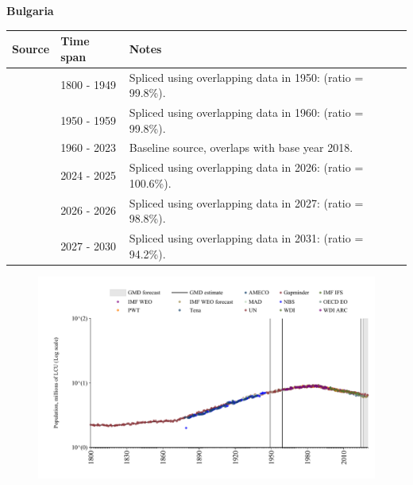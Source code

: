 \documentclass[12pt,a4paper,landscape]{article}
\begin{document}
\begin{adjustbox}{max totalsize={\paperwidth}{\paperheight},center}
\begin{minipage}[t][\textheight][t]{\textwidth}
\vspace*{0.5cm}
{}
\begin{center}
{\Large\bfseries Bulgaria}
\end{center}
\vspace{0.5cm}
\begin{table}[H]
\centering
\small
\begin{tabular}{|l|l|l|}
\hline
\textbf{Source} & \textbf{Time span} & \textbf{Notes} \\
\hline
\rowcolor{white}\cite{Gapminder}& 1800 - 1949 &Spliced using overlapping data in 1950: (ratio = 99.8\%).\\
\rowcolor{lightgray}\cite{IMF_IFS}& 1950 - 1959 &Spliced using overlapping data in 1960: (ratio = 99.8\%).\\
\rowcolor{white}\cite{WDI}& 1960 - 2023 &Baseline source, overlaps with base year 2018.\\
\rowcolor{lightgray}\cite{OECD_EO}& 2024 - 2025 &Spliced using overlapping data in 2026: (ratio = 100.6\%).\\
\rowcolor{white}\cite{AMECO}& 2026 - 2026 &Spliced using overlapping data in 2027: (ratio = 98.8\%).\\
\rowcolor{lightgray}\cite{Gapminder}& 2027 - 2030 &Spliced using overlapping data in 2031: (ratio = 94.2\%).\\
\hline
\end{tabular}
\end{table}
\begin{figure}[H]
\centering
\includegraphics[width=\textwidth,height=0.6\textheight,keepaspectratio]{graphs/BGR_pop.pdf}
\end{figure}
\end{minipage}
\end{adjustbox}
\end{document}
